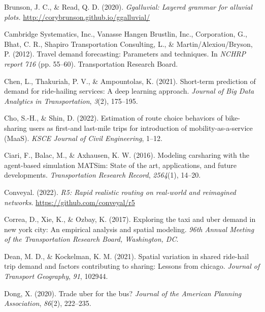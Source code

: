 \documentclass[fancy, masters]{byuthesis}
\newlength{\cslhangindent}
\newlength{\cslentryspacingunit} %
\newenvironment{CSLReferences}[2] %
 {%
  \setlength{\parindent}{0pt}
  \ifodd #1
  \let\oldpar\par
  \def\par{\hangindent=\cslhangindent\oldpar}
  \fi
  \setlength{\parskip}{#2\cslentryspacingunit}
 }%
 {}
\begin{document}
\begin{CSLReferences}{1}{0}
\leavevmode{}%
Brunson, J. C., \& Read, Q. D. (2020). \emph{Ggalluvial: Layered grammar for alluvial plots.} \url{http://corybrunson.github.io/ggalluvial/}

\leavevmode{}%
Cambridge Systematics, Inc., Vanasse Hangen Brustlin, Inc., Corporation, G., Bhat, C. R., Shapiro Transportation Consulting, L., \& Martin/Alexiou/Bryson, P. (2012). Travel demand forecasting: Parameters and techniques. In \emph{NCHRP report 716} (pp. 55--60). Transportation Research Board.

\leavevmode{}%
Chen, L., Thakuriah, P. V., \& Ampountolas, K. (2021). Short-term prediction of demand for ride-hailing services: A deep learning approach. \emph{Journal of Big Data Analytics in Transportation}, \emph{3}(2), 175--195.

\leavevmode{}%
Cho, S.-H., \& Shin, D. (2022). Estimation of route choice behaviors of bike-sharing users as first-and last-mile trips for introduction of mobility-as-a-service (MaaS). \emph{KSCE Journal of Civil Engineering}, 1--12.

\leavevmode{}%
Ciari, F., Balac, M., \& Axhausen, K. W. (2016). Modeling carsharing with the agent-based simulation MATSim: State of the art, applications, and future developments. \emph{Transportation Research Record}, \emph{2564}(1), 14--20.

\leavevmode{}%
Conveyal. (2022). \emph{R5: Rapid realistic routing on real-world and reimagined networks}. \url{https://github.com/conveyal/r5}

\leavevmode{}%
Correa, D., Xie, K., \& Ozbay, K. (2017). Exploring the taxi and uber demand in new york city: An empirical analysis and spatial modeling. \emph{96th Annual Meeting of the Transportation Research Board, Washington, DC}.

\leavevmode{}%
Dean, M. D., \& Kockelman, K. M. (2021). Spatial variation in shared ride-hail trip demand and factors contributing to sharing: Lessons from chicago. \emph{Journal of Transport Geography}, \emph{91}, 102944.

\leavevmode{}%
Dong, X. (2020). Trade uber for the bus? \emph{Journal of the American Planning Association}, \emph{86}(2), 222--235.


\end{CSLReferences}
\end{document}
